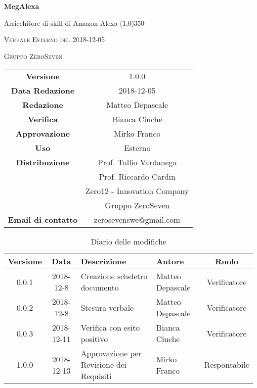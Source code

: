 \documentclass[a4paper,12pt]{article}
\author{Matteo Depascale}
\date{8-12-2018}
\begin{document}
\begin{titlepage}
	\centering
	{\huge\bfseries MegAlexa\par}
	Arricchitore di skill di Amazon Alexa
	\line(1,0){350} \\
	{\scshape\LARGE Verbale Esterno del 2018-12-05 \par}
	\vspace{1cm}
	{\scshape Gruppo ZeroSeven \par}
	\logo
	\begin{tabular}{c|c}
		{\hfill \textbf{Versione}} 			& 1.0.0				\\
		{\hfill\textbf{Data Redazione}} 	& 2018-12-05		\\ 
		{\hfill\textbf{Redazione}} 			&  		Matteo Depascale			\\ 
		{\hfill\textbf{Verifica}} 				&  		Bianca Ciuche		\\ 
		{\hfill\textbf{Approvazione}} 		&  		Mirko Franco	\\ 
		{\hfill\textbf{Uso}} 					& 	Esterno	\\ 
		{\hfill\textbf{Distribuzione}} 			& 			Prof. Tullio Vardanega \\ & Prof. Riccardo Cardin \\ & Zero12 - Innovation Company \\ & Gruppo ZeroSeven		\\ 
		{\hfill\textbf{Email di contatto}} & zerosevenswe@gmail.com \\
	\end{tabular}
\end{titlepage}
	

	
	\label{LastFrontPage}
	

	\newpage
	\cleardoublepage
		\begin{table}[tbph]
		\centering
		\begin{tabularx}{\textwidth}{|c|c|X|X|c|}
			\hline
			\textbf{Versione} & \textbf{Data} & \textbf{Descrizione} & \textbf{Autore} & \textbf{Ruolo} \\
			\hline
			0.0.1 & 2018-12-8 & Creazione scheletro documento
			& Matteo Depascale & Verificatore\\
			\hline
			0.0.2 & 2018-12-8 & Stesura verbale & Matteo Depascale & Verificatore \\
			\hline
			0.0.3 & 2018-12-11 & Verifica con esito positivo & Bianca Ciuche & Verificatore \\
			\hline
			1.0.0 & 2018-12-13 & Approvazione per Revisione dei Requisiti & Mirko Franco & Responsabile \\
			\hline
		\end{tabularx}
		\caption{Diario delle modifiche}
	\end{table}
	
\end{document}
